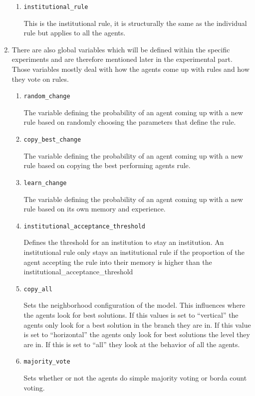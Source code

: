 \documentclass[a4paper]{article}
\begin{document}
\begin{enumerate}
\begin{enumerate}
 \item \begin{alltt}institutional_rule\end{alltt}
 This is the institutional rule, it is structurally the same as the individual rule but applies to all the agents.
\end{enumerate}
\item
There are also global variables which will be defined within the specific experiments and are therefore mentioned later in the experimental part. Those variables mostly deal 
with how the agents come up with rules and how they vote on rules. 
\begin{enumerate}
 \item \begin{alltt} random_change\end{alltt}
 The variable defining the probability of an agent coming up with a new rule based on randomly choosing the parameters that define the rule.
 \item \begin{alltt}copy_best_change\end{alltt}
 The variable defining the probability of an agent coming up with a new rule based on copying the best performing agents rule.
 \item \begin{alltt}learn_change\end{alltt}
 The variable defining the probability of an agent coming up with a new rule based on its own memory and experience.
 \item \begin{alltt}institutional_acceptance_threshold\end{alltt}
 Defines the threshold for an institution to stay an institution. An institutional rule only stays an institutional rule
 if the proportion of the agent accepting the rule into their memory is higher than the  institutional\_acceptance\_threshold
 \item \begin{alltt}copy_all\end{alltt}
 Sets the neighborhood configuration of the model. This influences where the agents look for best solutions. If this values is set to 
 ``vertical'' the agents only look for a best solution in the branch they are in. If this value is set to ``horizontal'' the 
 agents only look for best solutions the level they are in. If this is set to ``all'' they look at the behavior of all the agents.
 \item \begin{alltt}majority_vote\end{alltt}
 Sets whether or not the agents do simple majority voting or borda count voting. 
\end{enumerate}
\end{enumerate}
\end{document}
